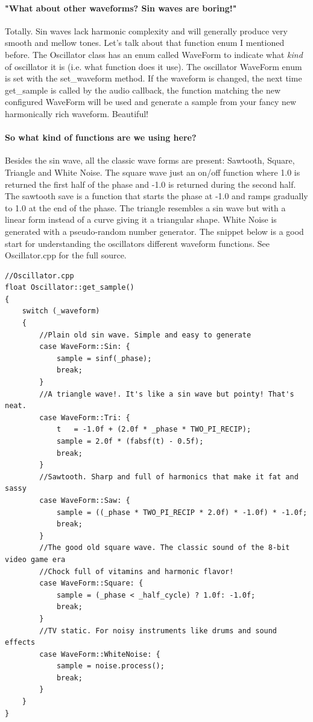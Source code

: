 \documentclass[acmlarge,screen]{acmart}
\begin{document}
	\paragraph{"What about other waveforms? Sin waves are boring!"} Totally. Sin waves lack harmonic complexity and will generally produce very smooth and mellow tones. Let's talk about that function enum I mentioned before. The Oscillator class has an enum called WaveForm to indicate what \textit{kind} of oscillator it is (i.e. what function does it use). The oscillator WaveForm enum is set with the set\_waveform method. If the waveform is changed, the next time get\_sample is called by the audio callback, the function matching the new configured WaveForm will be used and generate a sample from your fancy new harmonically rich waveform. \cite{downey_2016} Beautiful! 
	
	\paragraph{So what kind of functions are we using here?} Besides the sin wave, all the classic wave forms are present: Sawtooth, Square, Triangle and White Noise. The square wave just an on/off function where 1.0 is returned the first half of the phase and -1.0 is returned during the second half. The sawtooth save is a function that starts the phase at -1.0 and ramps gradually to 1.0 at the end of the phase. The triangle resembles a sin wave but with a linear form instead of a curve giving it a triangular shape. White Noise is generated with a pseudo-random number generator. \cite{tagi_2019} The snippet below is a good start for understanding the oscillators different waveform functions. See Oscillator.cpp for the full source.
	
	
	\begin{verbatim}
//Oscillator.cpp
float Oscillator::get_sample()
{
	switch (_waveform)
	{
		//Plain old sin wave. Simple and easy to generate
		case WaveForm::Sin: {
			sample = sinf(_phase);
			break;
		}
		//A triangle wave!. It's like a sin wave but pointy! That's neat.
		case WaveForm::Tri: {
			t   = -1.0f + (2.0f * _phase * TWO_PI_RECIP);
			sample = 2.0f * (fabsf(t) - 0.5f);
			break;
		}
		//Sawtooth. Sharp and full of harmonics that make it fat and sassy
		case WaveForm::Saw: {
			sample = ((_phase * TWO_PI_RECIP * 2.0f) * -1.0f) * -1.0f;
			break;
		}
		//The good old square wave. The classic sound of the 8-bit video game era
		//Chock full of vitamins and harmonic flavor!
		case WaveForm::Square: {
			sample = (_phase < _half_cycle) ? 1.0f: -1.0f;
			break;
		}
		//TV static. For noisy instruments like drums and sound effects
		case WaveForm::WhiteNoise: {
			sample = noise.process();
			break;
		}
	}
}
	\end{verbatim}
\end{document}
